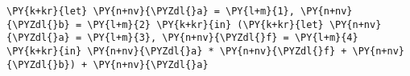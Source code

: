 \begin{Verbatim}[commandchars=\\\{\}]
\PY{k+kr}{let} \PY{n+nv}{\PYZdl{}a} = \PY{l+m}{1}, \PY{n+nv}{\PYZdl{}b} = \PY{l+m}{2} \PY{k+kr}{in} (\PY{k+kr}{let} \PY{n+nv}{\PYZdl{}a} = \PY{l+m}{3}, \PY{n+nv}{\PYZdl{}f} = \PY{l+m}{4} \PY{k+kr}{in} \PY{n+nv}{\PYZdl{}a} * \PY{n+nv}{\PYZdl{}f} + \PY{n+nv}{\PYZdl{}b}) + \PY{n+nv}{\PYZdl{}a}
\end{Verbatim}

